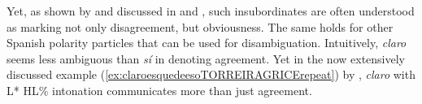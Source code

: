 Yet, as shown by \citet{Schwenter.2016} and discussed in  and , such insubordinates are often understood as marking not only disagreement, but obviousness. The same holds for other Spanish polarity particles that can be used for disambiguation. Intuitively, \textit{claro} seems less ambiguous than \textit{sí} in denoting agreement. Yet in the now extensively discussed example (\ref{ex:claroesquedeesoTORREIRAGRICErepeat}) by \citet{TorreiraGrice.2018}, \textit{claro} with L* HL\% intonation communicates more than just agreement. %
	



